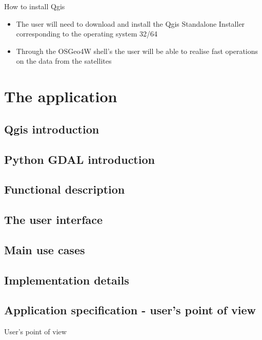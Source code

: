 \documentclass[12pt, a4paper]{report}
\begin{document}
{\Large How to install Qgis\par}

\begin{itemize}
  \item The user will need to download and install the Qgis Standalone Installer corresponding to the operating system 32/64
  \item Through the OSGeo4W shell's the user will be able to realise fast operations on the data from the satellites
\end{itemize}


\newpage{}


\chapter{The application}

\section{Qgis introduction} 


\section{Python GDAL introduction} 

\section{Functional description} 


\section{The user interface}


\section{Main use cases}


\section{Implementation details}

\newpage

\section{Application specification - user's point of view}

{\Large User's point of view\par}
\end{document}

